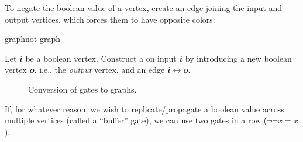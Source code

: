To negate the boolean value of a vertex, create an edge joining the input and
output vertices, which forces them to have opposite colors:

\begin{definition}{\NOT{} graph}{not-graph}

  Let \(𝒊\) be a boolean vertex.  Construct a  on input \(𝒊\)
  by introducing a new boolean vertex \(𝒐\), i.e., the \emph{output} vertex, and
  an edge \(𝒊↔𝒐\).

  \begin{figure}[H]
  \begin{center}
    \caption{Conversion of \NOT{} gates to \NOT{} graphs.}
  \end{center}
\end{figure}

\end{definition}

If, for whatever reason, we wish to replicate/propagate a boolean value across
multiple vertices (called a ``buffer'' gate), we can use two \NOT{} gates in a
row (\(¬¬x=x\)):

